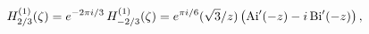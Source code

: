 \[\mathop{{H^{(1)}_{2/3}}\/}\nolimits\!\left(\zeta\right)=e^{-2\pi i/3}\mathop{{%
H^{(1)}_{-2/3}}\/}\nolimits\!\left(\zeta\right)=e^{\pi i/6}(\sqrt{3}/z)\left(%
\mathop{\mathrm{Ai}\/}\nolimits'\!\left(-z\right)-i\mathop{\mathrm{Bi}\/}%
\nolimits'\!\left(-z\right)\right),\]